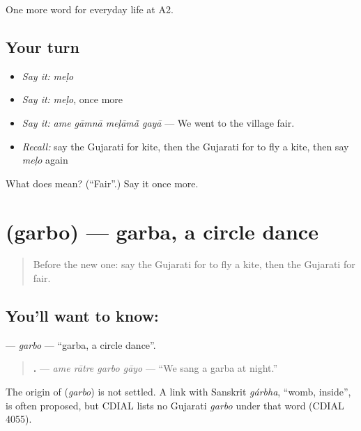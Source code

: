\begin{grammarlens}[title={What you've built}]
One more word for everyday life at A2.
\end{grammarlens}

\subsection*{Your turn}
\begin{itemize}
\raggedright
  \item \emph{Say it:} \emph{meḷo}
  \item \emph{Say it:} \emph{meḷo}, once more
  \item \emph{Say it:} \emph{ame gāmnā meḷāmā̃ gayā} — We went to the village fair.
  \item \emph{Recall:} say the Gujarati for kite, then the Gujarati for to fly a kite, then say \emph{meḷo} again
\end{itemize}

\begin{tcolorbox}[breakable,colback=teal!4,colframe=teal!35!black,title={Before you move on}]
What does  mean? (\textquotedblleft{}Fair\textquotedblright{}.) Say it once more.
\end{tcolorbox}
\section[\texorpdfstring{\gu{ગરબો} (garbo)}{ગરબો (garbo)}]{ (garbo) — garba, a circle dance}

\label{lesson:GU-C261-garbo}



\begin{quote}
Before the new one: say the Gujarati for to fly a kite, then the Gujarati for fair.
\end{quote}

\subsection*{You'll want to know: }
\textbf{} — \emph{garbo} — \textquotedblleft{}garba, a circle dance\textquotedblright{}.

\begin{quote}
\textbf{   .} — \emph{ame rātre garbo gāyo} — \textquotedblleft{}We sang a garba at night.\textquotedblright{}
\end{quote}

\begin{cousinweb}
The origin of \textbf{} (\emph{garbo}) is not settled. A link with Sanskrit \emph{gárbha}, \textquotedblleft{}womb, inside\textquotedblright{}, is often proposed, but CDIAL lists no Gujarati \emph{garbo} under that word (CDIAL 4055).
\end{cousinweb}

